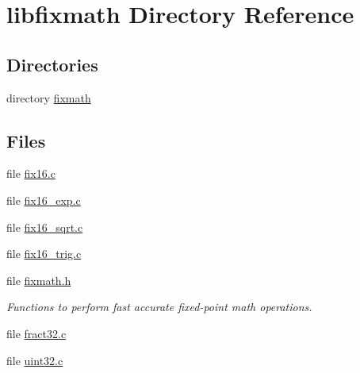 \hypertarget{dir_000003}{}\section{libfixmath Directory Reference}
\label{dir_000003}
\subsection*{Directories}
\begin{DoxyCompactItemize}
\item 
directory \hyperlink{dir_000004}{fixmath}
\end{DoxyCompactItemize}
\subsection*{Files}
\begin{DoxyCompactItemize}
\item 
file \hyperlink{fix16_8c}{fix16.\+c}
\item 
file \hyperlink{fix16__exp_8c}{fix16\+\_\+exp.\+c}
\item 
file \hyperlink{fix16__sqrt_8c}{fix16\+\_\+sqrt.\+c}
\item 
file \hyperlink{fix16__trig_8c}{fix16\+\_\+trig.\+c}
\item 
file \hyperlink{fixmath_8h}{fixmath.\+h}
\begin{DoxyCompactList}\small\item\em Functions to perform fast accurate fixed-\/point math operations. \end{DoxyCompactList}\item 
file \hyperlink{fract32_8c}{fract32.\+c}
\item 
file \hyperlink{uint32_8c}{uint32.\+c}
\end{DoxyCompactItemize}

